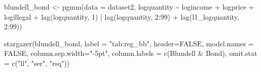 \documentclass[
]{article}
\newenvironment{Shaded}{\begin{snugshade}}{\end{snugshade}}
\newcommand{\AttributeTok}[1]{\textcolor[rgb]{0.77,0.63,0.00}{#1}}
\newcommand{\ConstantTok}[1]{\textcolor[rgb]{0.00,0.00,0.00}{#1}}
\newcommand{\DecValTok}[1]{\textcolor[rgb]{0.00,0.00,0.81}{#1}}
\newcommand{\FunctionTok}[1]{\textcolor[rgb]{0.00,0.00,0.00}{#1}}
\newcommand{\NormalTok}[1]{#1}
\newcommand{\OtherTok}[1]{\textcolor[rgb]{0.56,0.35,0.01}{#1}}
\newcommand{\SpecialCharTok}[1]{\textcolor[rgb]{0.00,0.00,0.00}{#1}}
\newcommand{\StringTok}[1]{\textcolor[rgb]{0.31,0.60,0.02}{#1}}
\let\oldShaded\Shaded
\let\endoldShaded\endShaded
\renewenvironment{Shaded}{\footnotesize\oldShaded}{\endoldShaded}
\begin{document}
\begin{Shaded}
\begin{Highlighting}[]
\NormalTok{blundell\_bond }\OtherTok{\textless{}{-}} \FunctionTok{pgmm}\NormalTok{(}\AttributeTok{data =}\NormalTok{ dataset2,}
\NormalTok{                          logquantity }\SpecialCharTok{\textasciitilde{}}\NormalTok{ logincome }\SpecialCharTok{+}\NormalTok{ logprice }\SpecialCharTok{+} 
\NormalTok{                            logillegal }\SpecialCharTok{+} \FunctionTok{lag}\NormalTok{(logquantity, }\DecValTok{1}\NormalTok{) }\SpecialCharTok{|} 
                            \FunctionTok{lag}\NormalTok{(logquantity, }\DecValTok{2}\SpecialCharTok{:}\DecValTok{99}\NormalTok{) }\SpecialCharTok{+} \FunctionTok{lag}\NormalTok{(l1\_logquantity, }\DecValTok{2}\SpecialCharTok{:}\DecValTok{99}\NormalTok{))}

\FunctionTok{stargazer}\NormalTok{(blundell\_bond, }\AttributeTok{label =} \StringTok{"tab:reg\_bb"}\NormalTok{, }\AttributeTok{header=}\ConstantTok{FALSE}\NormalTok{, }\AttributeTok{model.names =} \ConstantTok{FALSE}\NormalTok{,}
          \AttributeTok{column.sep.width=}\StringTok{"{-}5pt"}\NormalTok{,}
          \AttributeTok{column.labels =} \FunctionTok{c}\NormalTok{(}\StringTok{\textquotesingle{}Blundell \& Bond\textquotesingle{}}\NormalTok{),}
              \AttributeTok{omit.stat =} \FunctionTok{c}\NormalTok{(}\StringTok{"ll"}\NormalTok{, }\StringTok{"ser"}\NormalTok{, }\StringTok{"rsq"}\NormalTok{))}
\end{Highlighting}
\end{Shaded}
\end{document}
